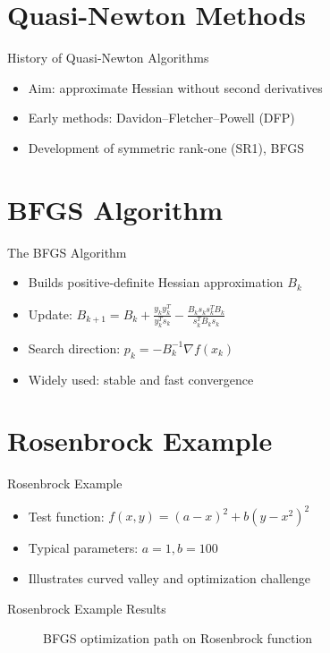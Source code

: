 \documentclass{beamer}
\begin{document}
\section{Quasi-Newton Methods}
\begin{frame}{History of Quasi-Newton Algorithms}
	\begin{itemize}
		\item Aim: approximate Hessian without second derivatives
		\item Early methods: Davidon–Fletcher–Powell (DFP)
		\item Development of symmetric rank-one (SR1), BFGS
	\end{itemize}
\end{frame}

\section{BFGS Algorithm}
\begin{frame}{The BFGS Algorithm}
	\begin{itemize}
		\item Builds positive-definite Hessian approximation $B_k$
		\item Update: $B_{k+1} = B_k + \frac{y_k y_k^T}{y_k^T s_k} - \frac{B_k s_k s_k^T B_k}{s_k^T B_k s_k}$
		\item Search direction: $p_k = -B_k^{-1} \nabla f(x_k)$
		\item Widely used: stable and fast convergence
	\end{itemize}
\end{frame}

\section{Rosenbrock Example}
\begin{frame}{Rosenbrock Example}
	\begin{itemize}
		\item Test function: $f(x,y) = (a - x)^2 + b(y - x^2)^2$
		\item Typical parameters: $a=1, b=100$
		\item Illustrates curved valley and optimization challenge
	\end{itemize}
\end{frame}

\begin{frame}{Rosenbrock Example Results}
	\begin{figure}
		\centering
		\caption{BFGS optimization path on Rosenbrock function}
	\end{figure}
\end{frame}
\end{document}
